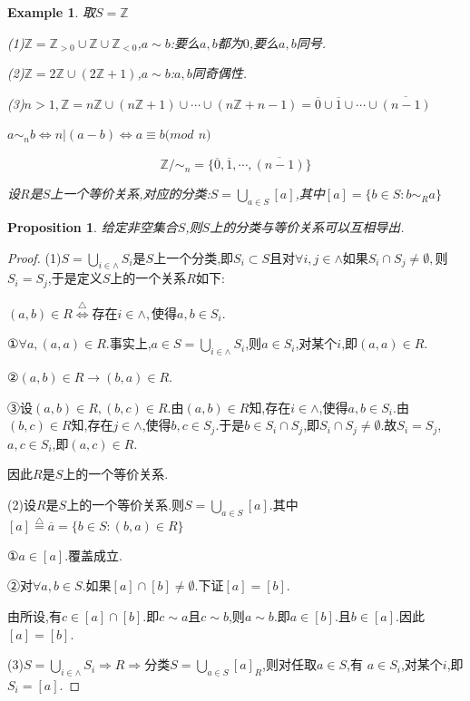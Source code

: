 \documentclass[UTF8]{article}
\newtheorem{prop}{Proposition}[section]
\newtheorem{exa}{Example}[section]
\begin{document}
\begin{exa}
	\quad 取$S=\mathbb{Z}$
	
	(1)$\mathbb{Z}=\mathbb{Z}_{{>}{0}}\cup\mathbb{Z}\cup\mathbb{Z}_{<0}$,$a\sim b$:要么$a,b$都为$0$,要么$a,b$同号.
	
	(2)$\mathbb{Z}=2\mathbb{Z}\cup(2\mathbb{Z}+1)$,$a\sim b$:$a,b$同奇偶性.
	
	(3)$n>1,\mathbb{Z}=n\mathbb{Z}\cup(n\mathbb{Z}+1)\cup\cdots\cup(n\mathbb{Z}+n-1)=\overline{0}\cup\overline{1}\cup\cdots\cup\overline{(n-1)}$
	\begin{center}
		$a\sim_n{b}\Leftrightarrow n|(a-b)\Leftrightarrow a\equiv b(mod$ $n)$
	\end{center}
	$$\mathbb{Z}/\sim_n=\{\overline{0},\overline{1},\cdots,\overline{(n-1)}\}$$
	
	设$R$是$S$上一个等价关系,对应的分类:$S=\bigcup_{a\in S}[a]$,其中$[a]=\{b\in S:b{\sim_R}a\}$
\end{exa}
\begin{prop}
	\quad 给定非空集合$S$,则$S$上的分类与等价关系可以互相导出.
\end{prop}
\begin{proof}
	(1)$S=\bigcup_{i\in\land}S_i$是$S$上一个分类,即$S_i\subset S$且对$\forall i,j\in\land$如果$S_i\cap S_j\ne\emptyset,$则$S_i= S_j$,于是定义$S$上的一个关系$R$如下:
	\begin{center}$(a,b)\in R\stackrel{\bigtriangleup}{\Longleftrightarrow}$存在$i\in\land,$使得$a,b\in S_i.$
	\end{center}
	
	①$\forall a,(a,a)\in R$.事实上,$a\in S=\bigcup_{i\in\land}S_i$,则$ a\in S_i$,对某个$i$,即$(a,a)\in R$.
	
	②$(a,b)\in R\rightarrow (b,a)\in R$.
	
	③设$(a,b)\in R,(b,c)\in R$.由$(a,b)\in R$知,存在$i\in\land$,使得$a,b\in S_i$.由$(b,c)\in R$知,存在$j\in\land$,使得$b,c\in S_j$.于是$b\in S_i\cap S_j$,即$S_i\cap S_j\ne\emptyset$.故$S_i= S_j$,$a,c\in S_i$,即$(a,c)\in R$.
	
	因此$R$是$S$上的一个等价关系.
	
	(2)设$R$是$S$上的一个等价关系.则$S=\bigcup_{a\in S}[a]$.其中$[a]\stackrel{\bigtriangleup}{=}\overline{a}=\{b\in S:(b,a)\in R\}$
	
	①$a\in [a].$覆盖成立.
	
	②对$\forall a,b\in S.$如果$[a]\cap [b]\ne\emptyset$.下证$[a]=[b]$.
	
	由所设,有$c\in[a]\cap [b]$.即$c\sim a$且$c\sim b$,则$a\sim b$.即$a\in [b].$且$b\in [a].$因此$[a]=[b]$.
	
	(3)$S=\bigcup_{i\in\land}S_i\Rightarrow R\Rightarrow$分类$S=\bigcup_{a\in S}[a]_R$,则对任取$a\in S$,有
	$a\in S_i$,对某个$i$,即$S_i=[a]$.
\end{proof}
\end{document}
